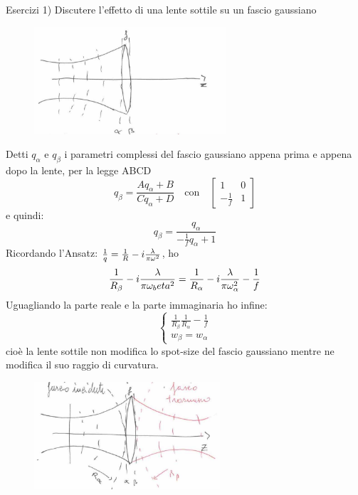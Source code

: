 Esercizi
1) Discutere l'effetto di una lente sottile su un fascio gaussiano
\begin{figure}[H]
\centering
\includegraphics[height=4cm]{images/1}
\end{figure}
Detti $q_\alpha$ e $q_\beta$ i parametri complessi del fascio gaussiano appena prima e appena dopo la lente, per la legge ABCD
\begin{equation*}
q_\beta = \frac{Aq_\alpha + B}{Cq_\alpha + D} \quad \text{con} \quad
\begin{bmatrix}
1	&	0\\
-\frac{1}{f}	&	1
\end{bmatrix}
\end{equation*}
e quindi:
\begin{equation*}
q_\beta = \frac{q_\alpha}{-\frac{1}{f}q_\alpha + 1}
\end{equation*}
Ricordando l'Ansatz: $\frac{1}{q} = \frac{1}{R} -i\frac{\lambda}{\pi \omega^2}$, ho
\begin{equation*}
\frac{1}{R_\beta} -i\frac{\lambda}{\pi\omega_beta^2} = \frac{1}{R_\alpha} -i\frac{\lambda}{\pi \omega_\alpha^2} - \frac{1}{f}
\end{equation*}
Uguagliando la parte reale e la parte immaginaria ho infine:
\begin{equation*}
\begin{cases}
\frac{1}{R_\beta} \frac{1}{R_\alpha} - \frac{1}{f}\\
w_\beta = w_\alpha
\end{cases}
\end{equation*}
cioè la lente sottile non modifica lo spot-size del fascio gaussiano mentre ne modifica il suo raggio di curvatura.
\begin{figure}[H]
\centering
\includegraphics[height=4cm]{images/2}
\end{figure}


